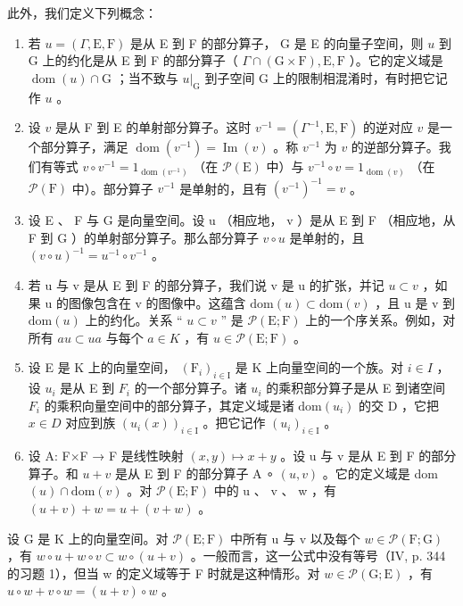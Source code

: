 此外，我们定义下列概念：

\begin{enumerate}
\def\labelenumi{(\roman{enumi})}
\item
  若 \(u = (\Gamma, \mathrm{E}, \mathrm{F})\) 是从 E 到 F 的部分算子， G 是 E 的向量子空间，则 \(u\) 到 G 上的约化是从 E 到 F 的部分算子（ \(\Gamma \cap (\mathrm{G} \times \mathrm{F}), \mathrm{E}, \mathrm{F}\) ）。它的定义域是 \(\operatorname{dom}(u) \cap \mathrm{G}\) ；当不致与 \(u|_{\mathrm{G}}\) 到子空间 G 上的限制相混淆时，有时把它记作 \(u\) 。
\item
  设 \(v\) 是从 F 到 E 的单射部分算子。这时 \(v^{-1} = (\Gamma^{-1}, \mathrm{E}, \mathrm{F})\) 的逆对应 \(v\) 是一个部分算子，满足 \(\operatorname{dom}(v^{-1}) = \operatorname{Im}(v)\) 。称 \(v^{-1}\) 为 \(v\) 的逆部分算子。我们有等式 \(v \circ v^{-1} = 1_{\operatorname{dom}(v^{-1})}\) （在 \(\mathcal{P}(\mathrm{E})\) 中）与 \(v^{-1} \circ v = 1_{\operatorname{dom}(v)}\) （在 \(\mathcal{P}(\mathrm{F})\) 中）。部分算子 \(v^{-1}\) 是单射的，且有 \((v^{-1})^{-1} = v\) 。
\item
  设 E 、 F 与 G 是向量空间。设 u （相应地， v ）是从 E 到 F （相应地，从 F 到 G ）的单射部分算子。那么部分算子 \(v \circ u\) 是单射的，且 \((v \circ u)^{-1} = u^{-1} \circ v^{-1}\) 。
\item
  若 u 与 v 是从 E 到 F 的部分算子，我们说 v 是 u 的扩张，并记 \(u \subset v\) ，如果 u 的图像包含在 v 的图像中。这蕴含 \(\text{dom}(u) \subset \text{dom}(v)\) ，且 u 是 v 到 \(\text{dom}(u)\) 上的约化。关系 “ \(u \subset v\) ” 是 \(\mathcal{P}(\text{E};\text{F})\) 上的一个序关系。例如，对所有 \(au \subset ua\) 与每个 \(a \in K\) ，有 \(u \in \mathcal{P}(\text{E};\text{F})\) 。
\item
  设 E 是 K 上的向量空间， \((\mathrm{F}_{i})_{i\in\mathrm{I}}\) 是 K 上向量空间的一个族。对 \(i\in I\) ，设 \(u_{i}\) 是从 E 到 \(F_{i}\) 的一个部分算子。诸 \(u_{i}\) 的乘积部分算子是从 E 到诸空间 \(F_{i}\) 的乘积向量空间中的部分算子，其定义域是诸 \(\mathrm{dom}(u_{i})\) 的交 D ，它把 \(x\in D\) 对应到族 \((u_{i}(x))_{i\in\mathrm{I}}\) 。把它记作 \((u_{i})_{i\in\mathrm{I}}\) 。
\item
  设 A: F×F → F 是线性映射 \((x,y)\mapsto x+y\) 。设 u 与 v 是从 E 到 F 的部分算子。和 \(u+v\) 是从 E 到 F 的部分算子 A ∘ \((u,v)\) 。它的定义域是 dom \((u)\cap\text{dom}(v)\) 。对 \(\mathcal{P}(\text{E};\text{F})\) 中的 u 、 v 、 w ，有 \((u+v)+w=u+(v+w)\) 。
\end{enumerate}

设 G 是 K 上的向量空间。对 \(\mathcal{P}(\mathrm{E};\mathrm{F})\) 中所有 u 与 v 以及每个 \(w \in \mathcal{P}(\mathrm{F};\mathrm{G})\) ，有 \(w \circ u + w \circ v \subset w \circ (u + v)\) 。一般而言，这一公式中没有等号（IV, p. 344 的习题 1），但当 w 的定义域等于 F 时就是这种情形。对 \(w \in \mathcal{P}(\mathrm{G};\mathrm{E})\) ，有 \(u \circ w + v \circ w = (u + v) \circ w\) 。

